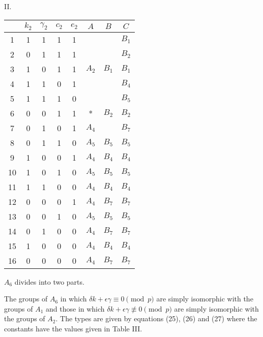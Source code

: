 \documentclass[oneside]{article}
\begin{document}
\medskip
\begin{center}
\large II. \normalsize

\smallskip
\begin{tabular}{|c|c|c|c|c|c|c|c|} \hline
    &$k_2$&$\gamma_2$&$c_2$&$e_2$&  $A$  &  $B$  &  $C$  \\ \hline
 1  &  1  &    1     &  1  &  1  &       &       & $B_1$ \\ \hline
 2  &  0  &    1     &  1  &  1  &       &       & $B_2$ \\ \hline
 3  &  1  &    0     &  1  &  1  & $A_2$ & $B_1$ & $B_1$ \\ \hline
 4  &  1  &    1     &  0  &  1  &       &       & $B_4$ \\ \hline
 5  &  1  &    1     &  1  &  0  &       &       & $B_5$ \\ \hline
 6  &  0  &    0     &  1  &  1  &   *   & $B_2$ & $B_2$ \\ \hline
 7  &  0  &    1     &  0  &  1  & $A_4$ &       & $B_7$ \\ \hline
 8  &  0  &    1     &  1  &  0  & $A_5$ & $B_5$ & $B_5$ \\ \hline
 9  &  1  &    0     &  0  &  1  & $A_4$ & $B_4$ & $B_4$ \\ \hline
 10 &  1  &    0     &  1  &  0  & $A_5$ & $B_5$ & $B_5$ \\ \hline
 11 &  1  &    1     &  0  &  0  & $A_4$ & $B_4$ & $B_4$ \\ \hline
 12 &  0  &    0     &  0  &  1  & $A_4$ & $B_7$ & $B_7$ \\ \hline
 13 &  0  &    0     &  1  &  0  & $A_5$ & $B_5$ & $B_5$ \\ \hline
 14 &  0  &    1     &  0  &  0  & $A_4$ & $B_7$ & $B_7$ \\ \hline
 15 &  1  &    0     &  0  &  0  & $A_4$ & $B_4$ & $B_4$ \\ \hline
 16 &  0  &    0     &  0  &  0  & $A_4$ & $B_7$ & $B_7$ \\ \hline
\end{tabular}
\end{center}

$A_6$ divides into two parts.

The groups of $A_6$ in which $\delta k + \epsilon\gamma \equiv 0 \pmod{p}$
are simply isomorphic with the groups of $A_1$ and those in which $\delta
k + \epsilon\gamma \not\equiv 0 \pmod{p}$ are simply isomorphic with the
groups of $A_2$. The types are given by equations (25), (26) and (27) where
the constants have the values given in Table III.
\end{document}
